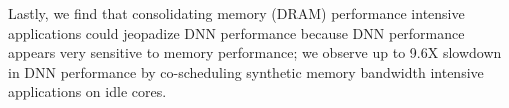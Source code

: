 Lastly, we find that consolidating memory (DRAM) performance
intensive applications could jeopadize DNN performance because DNN
performance appears very sensitive to memory performance; we observe up
to 9.6X slowdown in DNN performance by co-scheduling synthetic memory 
bandwidth intensive applications on idle cores.








